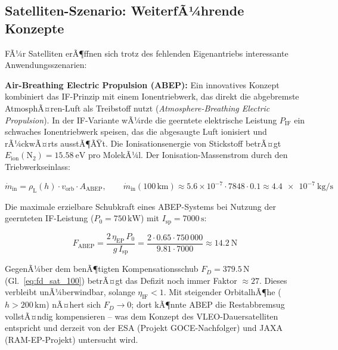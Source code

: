 ﻿\documentclass[12pt, a4paper]{report}
\theoremstyle{definition}
\theoremstyle{remark}
\newcommand{\rhoL}{\rho_{\text{L}}}
\begin{document}
\subsection{Satelliten-Szenario: WeiterfÃ¼hrende Konzepte}
\label{ssec:ausblick_satellit}

FÃ¼r Satelliten erÃ¶ffnen sich trotz des fehlenden Eigenantriebs interessante
Anwendungsszenarien:

\textbf{Air-Breathing Electric Propulsion (ABEP):}
Ein innovatives Konzept kombiniert das IF-Prinzip mit einem Ionentriebwerk,
das direkt die abgebremste AtmosphÃ¤ren-Luft als Treibstoff nutzt
(\emph{Atmosphere-Breathing Electric Propulsion}). In der IF-Variante
wÃ¼rde die geerntete elektrische Leistung $P_{\text{IF}}$ ein schwaches
Ionentriebwerk speisen, das die abgesaugte Luft ionisiert und rÃ¼ckwÃ¤rts
ausstÃ¶ÃŸt. Die Ionisationsenergie von Stickstoff betrÃ¤gt
$E_{\text{ion}}(\text{N}_2) = \SI{15.58}{\electronvolt}$ pro MolekÃ¼l. Der
Ionisation-Massenstrom durch den Triebwerkseinlass:

\begin{equation}
  \dot{m}_{\text{in}} = \rhoL(h) \cdot v_{\text{orb}} \cdot A_{\text{ABEP}},
  \qquad \dot{m}_{\text{in}}(100\,\text{km}) \approx
  5.6\times10^{-7} \cdot 7848 \cdot 0.1 \approx \SI{4.4e-7}{\kilo\gram\per\second}
  \label{eq:mdot_abep}
\end{equation}

Die maximale erzielbare Schubkraft eines ABEP-Systems bei Nutzung der
geernteten IF-Leistung ($P_0 = 750\,\text{kW}$) mit $I_{\text{sp}} = 7000\,\text{s}$:

\begin{equation}
  F_{\text{ABEP}} = \frac{2\,\eta_{\text{EP}}\,P_0}{g\,I_{\text{sp}}}
  = \frac{2 \cdot 0.65 \cdot 750\,000}{9.81 \cdot 7000}
  \approx \SI{14.2}{\newton}
  \label{eq:f_abep}
\end{equation}

GegenÃ¼ber dem benÃ¶tigten Kompensationsschub $F_D = 379.5\,\text{N}$ (Gl.~\eqref{eq:fd_sat_100})
betrÃ¤gt das Defizit noch immer Faktor $\approx 27$. Dieses verbleibt unÃ¼berwindbar,
solange $\eta_{\text{IF}} < 1$. Mit steigender OrbitalhÃ¶he ($h > 200\,\text{km}$)
nÃ¤hert sich $F_D \to 0$; dort kÃ¶nnte ABEP die Restabbremsug vollstÃ¤ndig
kompensieren -- was dem Konzept des VLEO-Dauersatelliten entspricht und derzeit
von der ESA (Projekt GOCE-Nachfolger) und JAXA (RAM-EP-Projekt) untersucht wird.
\end{document}
